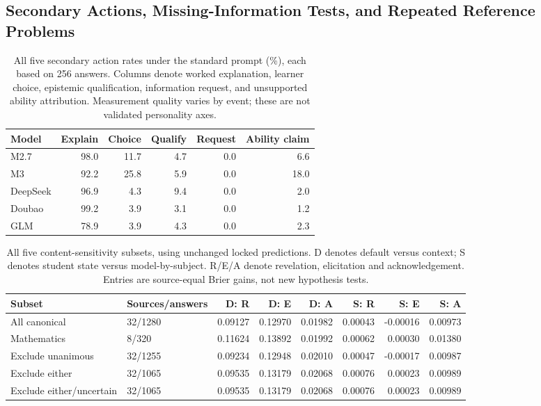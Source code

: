 \subsection{Secondary Actions, Missing-Information Tests, and Repeated Reference Problems}

\begin{table}[htbp]\centering\small
\begin{tabular}{lrrrrr}\toprule
Model & Explain & Choice & Qualify & Request & Ability claim \\
\midrule
M2.7 & 98.0 & 11.7 & 4.7 & 0.0 & 6.6 \\
M3 & 92.2 & 25.8 & 5.9 & 0.0 & 18.0 \\
DeepSeek & 96.9 & 4.3 & 9.4 & 0.0 & 2.0 \\
Doubao & 99.2 & 3.9 & 3.1 & 0.0 & 1.2 \\
GLM & 78.9 & 3.9 & 4.3 & 0.0 & 2.3 \\
\bottomrule\end{tabular}
\caption{All five secondary action rates under the standard prompt (\%), each based on
256 answers. Columns denote worked explanation, learner choice, epistemic
qualification, information request, and unsupported ability attribution.
Measurement quality varies by event; these are not validated personality axes.}
\label{tab:secondary-events}\end{table}

\begin{table}[htbp]\centering\small
\setlength{\tabcolsep}{4pt}
\begin{tabular}{llrrrrrr}\toprule
Subset & Sources/answers & D: R & D: E & D: A & S: R & S: E & S: A \\
\midrule
All canonical & 32/1280 & 0.09127 & 0.12970 & 0.01982 & 0.00043 & -0.00016 & 0.00973 \\
Mathematics & 8/320 & 0.11624 & 0.13892 & 0.01992 & 0.00062 & 0.00030 & 0.01380 \\
Exclude unanimous & 32/1255 & 0.09234 & 0.12948 & 0.02010 & 0.00047 & -0.00017 & 0.00987 \\
Exclude either & 32/1065 & 0.09535 & 0.13179 & 0.02068 & 0.00076 & 0.00023 & 0.00989 \\
Exclude either/uncertain & 32/1065 & 0.09535 & 0.13179 & 0.02068 & 0.00076 & 0.00023 & 0.00989 \\
\bottomrule\end{tabular}
\caption{All five content-sensitivity subsets, using unchanged locked
predictions. D denotes default versus context; S denotes student state versus
model-by-subject. R/E/A denote revelation, elicitation and acknowledgement.
Entries are source-equal Brier gains, not new hypothesis tests.}
\label{tab:content-subsets}\end{table}

